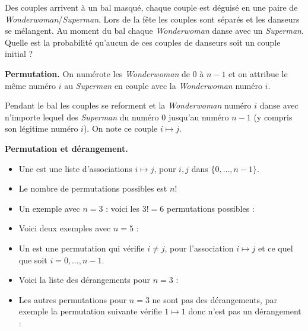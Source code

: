 \documentclass[11pt,class=report,crop=false]{standalone}
\begin{document}
\begin{cours}[Dérangements]


Des couples arrivent à un bal masqué, chaque couple est déguisé en une paire de \emph{Wonderwoman}/\emph{Superman}. Lors de la fête les couples sont séparés et les danseurs se mélangent. Au moment du bal chaque \emph{Wonderwoman} danse avec un \emph{Superman}. Quelle est la probabilité qu'aucun de ces couples de danseurs soit un couple initial ?


\textbf{Permutation.}
On numérote les \emph{Wonderwoman} de $0$ à $n-1$ et on attribue le même numéro $i$
au \emph{Superman} en couple avec la \emph{Wonderwoman} numéro $i$.

Pendant le bal les couples se reforment et la \emph{Wonderwoman} numéro $i$ danse avec n'importe lequel des \emph{Superman} du numéro $0$ jusqu'au numéro $n-1$ (y compris son légitime numéro $i$).
On note ce couple $i \mapsto j$.


\textbf{Permutation et dérangement.}

\begin{itemize}
    \item Une  est une liste d'associations $i \mapsto j$, pour $i,j$ dans $\{0,\ldots,n-1\}$.
    \item Le nombre de permutations possibles est $n!$ 
    \item Un exemple avec $n=3$ : voici les $3!=6$ permutations possibles :


    \item Voici deux exemples avec $n=5$ :
    
    \item Un  est une permutation qui vérifie $i\neq j$, pour l'association $i \mapsto j$ et ce quel que soit $i=0,\ldots,n-1$.
    \item Voici la liste des dérangements pour $n=3$ : 
       
    \item Les autres permutations pour $n=3$ ne sont pas des dérangements, par exemple la permutation suivante vérifie $1 \mapsto 1$ donc n'est pas un dérangement :
 

\end{itemize}
\end{cours}
\end{document}
